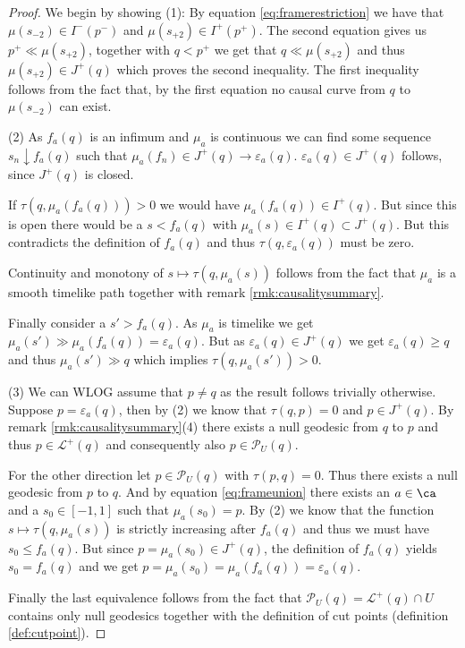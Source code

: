 \begin{proof}
We begin by showing (1): By equation \ref{eq:framerestriction} we have that $\mu(s_{-2})\in I^-(p^-)$ and $\mu(s_{+2})\in I^+(p^+)$. The second equation gives us $p^+\ll \mu(s_{+2})$, together with $q<p^+$ we get that $q\ll \mu(s_{+2})$ and thus $\mu(s_{+2})\in J^+(q)$ which proves the second inequality. The first inequality follows from the fact that, by the first equation no causal curve from $q$ to $\mu(s_{-2})$ can exist.

(2) As $f_a(q)$ is an infimum and $\mu_a$ is continuous we can find some sequence $s_n\downarrow f_a(q)$ such that $\mu_a(f_n) \in J^+(q) \to \varepsilon_a(q)$. $\varepsilon_a(q)\in J^+(q)$ follows, since $J^+(q)$ is closed. 

If $\tau(q,\mu_a(f_a(q)))>0$ we would have $\mu_a(f_a(q))\in I^+(q)$. But since this is open there would be a $s<f_a(q)$ with $\mu_a(s)\in I^+(q) \subset J^+(q)$. But this contradicts the definition of $f_a(q)$ and thus $\tau(q,\varepsilon_a(q))$ must be zero.

Continuity and monotony of $s\mapsto \tau(q,\mu_a(s))$ follows from the fact that $\mu_a$ is a smooth timelike path together with remark \ref{rmk:causalitysummary}.

Finally consider a $s'>f_a(q)$. As $\mu_a$ is timelike we get $\mu_a(s')\gg \mu_a(f_a(q)) = \varepsilon_a(q)$. But as $\varepsilon_a(q)\in J^+(q)$ we get $\varepsilon_a(q) \geq q$ and thus $\mu_a(s') \gg  q$ which implies $\tau(q,\mu_a(s'))>0$.

(3) We can WLOG assume that $p\neq q$ as the result follows trivially otherwise. Suppose $p=\varepsilon_a(q)$, then by (2) we know that $\tau(q,p)=0$ and $p\in J^+(q)$. By remark \ref{rmk:causalitysummary}(4) there exists a null geodesic from $q$ to $p$ and thus $p\in \mathcal{L}^+(q)$ and consequently also $p\in \mathcal{P}_U(q)$. 

For the other direction let $p\in \mathcal{P}_U(q)$ with $\tau(p,q)=0$. Thus there exists a null geodesic from $p$ to $q$. And by equation \ref{eq:frameunion} there exists an $a\in \ca$ and a $s_0\in [-1,1]$ such that $\mu_a(s_0)=p$.
By (2) we know that the function $s\mapsto \tau(q,\mu_a(s))$ is strictly increasing after $f_a(q)$ and thus we must have $s_0\leq f_a(q)$. But since $p=\mu_a(s_0) \in J^+(q)$, the definition of $f_a(q)$ yields $s_0=f_a(q)$ and we get $p=\mu_a(s_0) = \mu_a(f_a(q)) = \varepsilon_a(q)$.

Finally the last equivalence follows from the fact that $\mathcal{P}_U(q) = \mathcal{L}^+(q)\cap U$ contains only null geodesics together with the definition of cut points (definition \ref{def:cutpoint}).


\end{proof}
